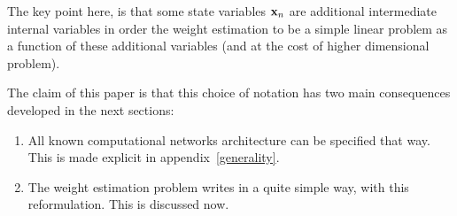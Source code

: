 The key point here, is that some state variables ${\bf x}_n$ are additional intermediate internal variables in order the weight estimation to be a simple linear problem as a function of these additional variables (and at the cost of higher dimensional problem).

The claim of this paper is that this choice of notation has two main consequences developed in the next sections: \begin{enumerate}
\item All known computational networks architecture can be specified that way. This is made explicit in appendix~\ref{generality}.
\item The weight estimation problem writes in a quite simple way, with this reformulation. This is discussed now.
\end{enumerate}
